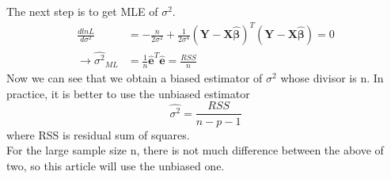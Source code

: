 \documentclass[a4paper]{article}
\begin{document}
\noindent
The next step is to get MLE of $\sigma^2$.
\begin{equation*}
\begin{aligned}
	\frac{dlnL}{d\sigma^2} & = -\frac{n}{2\sigma^2} + \frac{1}{2\sigma^4} (\textbf{Y} - \textbf{X} \hat{\bm{\beta}})^T (\textbf{Y} - \textbf{X} \hat{\bm{\beta}}) = 0 \\
	 \rightarrow \hat{\sigma^2}_{ML} & = \frac{1}{n} \hat{\textbf{e}}^T \hat{\textbf{e}} = \frac{RSS}{n}
\end{aligned} 
\end{equation*}
Now we can see that we obtain a biased estimator of $\sigma^2$ whose divisor is n. In practice, it is better to use the unbiased estimator \[\hat{\sigma^2} = \frac{RSS}{n-p-1}\] where RSS is residual sum of squares.\\
For the large sample size n, there is not much difference between the above of two, so this article will use the unbiased one. 























%
%
%
%









%
%


	
\end{document}
